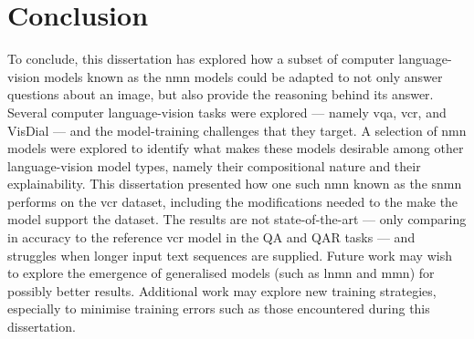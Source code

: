 \chapter{Conclusion}
\label{chp:conclusion}

To conclude, this dissertation has explored how a subset of computer language-vision models known as the \gls{nmn} models could be adapted to not only answer questions about an image, but also provide the reasoning behind its answer.
Several computer language-vision tasks were explored --- namely \gls{vqa}, \gls{vcr}, and VisDial --- and the model-training challenges that they target.
A selection of \gls{nmn} models were explored to identify what makes these models desirable among other language-vision model types, namely their compositional nature and their explainability.
This dissertation presented how one such \gls{nmn} known as the \gls{snmn} performs on the \gls{vcr} dataset, including the modifications needed to the make the model support the dataset.
The results are not state-of-the-art --- only comparing in accuracy to the reference \gls{vcr} model in the Q\rightarrow{}A and QA\rightarrow{}R tasks --- and struggles when longer input text sequences are supplied.
Future work may wish to explore the emergence of generalised models (such as \gls{lnmn} and \gls{mmn}) for possibly better results.
Additional work may explore new training strategies, especially to minimise training errors such as those encountered during this dissertation.

